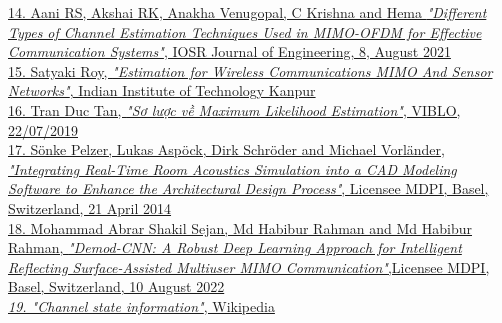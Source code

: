 \documentclass{article}
\begin{document}
\href{ https://www.academia.edu/51012261/Analysis_and_Optimization_of_Fast_Channel_Estimation_In_Millimeter_Wave_Vehicular_Communication }{14. Aani RS, Akshai RK, Anakha Venugopal, C Krishna and Hema \textit{"Different Types of Channel Estimation Techniques Used in MIMO-OFDM for Effective Communication Systems"}, IOSR Journal of Engineering, 8, August 2021} \\

\href{ https://www.youtube.com/playlist?list=PL1qOdYF_cLbqSpbZfp51Xo-J-5REr1UCg }{15. Satyaki Roy, \textit{"Estimation for Wireless Communications MIMO And Sensor Networks"}, Indian Institute of Technology Kanpur} \\

\href{ https://viblo.asia/p/so-luoc-ve-maximum-likelihood-estimation-1Je5EvrYKnL }{16. Tran Duc Tan, \textit{"Sơ lược về Maximum Likelihood Estimation"}, VIBLO, 22/07/2019} \\

\href{ https://www.mdpi.com/2075-5309/4/2/113 }{17. Sönke Pelzer, Lukas Aspöck, Dirk Schröder and Michael Vorländer, \textit{"Integrating Real-Time Room Acoustics Simulation into a CAD Modeling Software to Enhance the Architectural Design Process"}, Licensee MDPI, Basel, Switzerland, 21 April 2014} \\

\href{ https://www.mdpi.com/1424-8220/22/16/5971 }{18. Mohammad Abrar Shakil Sejan, Md Habibur Rahman and Md Habibur Rahman, \textit{"Demod-CNN: A Robust Deep Learning Approach for Intelligent Reflecting Surface-Assisted Multiuser MIMO Communication"},Licensee MDPI, Basel, Switzerland, 10 August 2022} \\

\href{ https://en.wikipedia.org/wiki/Channel_state_information }{\textit{19. "Channel state information"}, Wikipedia} \\
\end{document}
